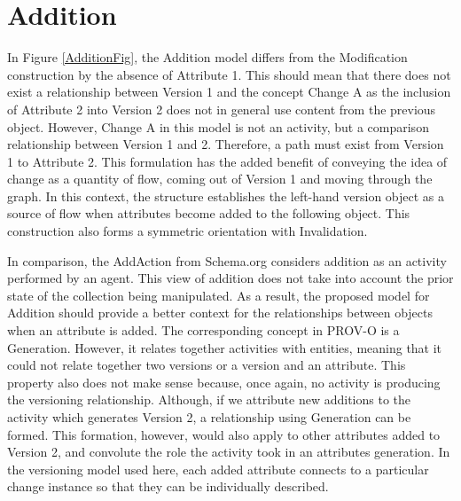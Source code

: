 \section{Addition}

In Figure \ref{AdditionFig}, the Addition model differs from the Modification construction by the absence of Attribute 1.
This should mean that there does not exist a relationship between Version 1 and the concept Change A as the inclusion of Attribute 2 into Version 2 does not in general use content from the previous object.
However, Change A in this model is not an activity, but a comparison relationship between Version 1 and 2.
Therefore, a path must exist from Version 1 to Attribute 2.
This formulation has the added benefit of conveying the idea of change as a quantity of flow, coming out of Version 1 and moving through the graph.
In this context, the structure establishes the left-hand version object as a source of flow when attributes become added to the following object.
This construction also forms a symmetric orientation with Invalidation.

In comparison, the AddAction from Schema.org considers addition as an activity performed by an agent.
This view of addition does not take into account the prior state of the collection being manipulated.
As a result, the proposed model for Addition should provide a better context for the relationships between objects when an attribute is added.
The corresponding concept in PROV-O is a Generation.
However, it relates together activities with entities, meaning that it could not relate together two versions or a version and an attribute.
This property also does not make sense because, once again, no activity is producing the versioning relationship.
Although, if we attribute new additions to the activity which generates Version 2, a relationship using Generation can be formed.
This formation, however, would also apply to other attributes added to Version 2, and convolute the role the activity took in an attributes generation.
In the versioning model used here, each added attribute connects to a particular change instance so that they can be individually described.

